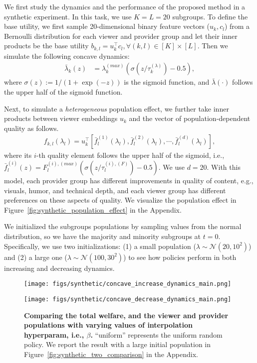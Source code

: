 We first study the dynamics and the performance of the proposed method in a synthetic experiment. In this task, we use $K = L = 20$ subgroups. To define the base utility, we first sample 20-dimensional binary feature vectors ($u_k, c_l$) from a Bernoulli distribution for each viewer and provider group and let their inner products be the base utility $b_{k,l} = u_k^{\top} c_l, \forall (k,l) \in [K] \times [L]$. Then we simulate the following concave dynamics:
\begin{align}
    \bar{\lambda}_k(z) 
        &= \lambda_k^{(max)} (\sigma(z / \tau_k^{(\lambda)}) - 0.5),  \label{eq:experiment_population_dynamics}
\end{align}
where $\sigma(z) := 1 / (1 + \exp(-z))$ is the sigmoid function, and $\bar{\lambda}(\cdot)$ follows the upper half of the sigmoid function.

Next, to simulate a \textit{heterogeneous} population effect, we further take inner products between viewer embeddings $u_k$ and the vector of population-dependent quality as follows. 
\begin{align}
    f_{k,l}(\lambda_l) = u_k^{\top} [\bar{f}_l^{(1)}(\lambda_l), \bar{f}_l^{(2)}(\lambda_l), \cdots, \bar{f}_l^{(d)}(\lambda_l)], \label{eq:synthetic_population_effect}
\end{align} 
where its $i$-th quality element follows the upper half of the sigmoid, i.e., $\bar{f}_{l}^{(i)}(z) = F_{l}^{(i), (max)} (\sigma(z / \tau_{l}^{(i), (F)}) - 0.5)$.
We use $d=20$. With this model, each provider group has different improvements in  quality of content, e.g., visuals, humor, and technical depth, and each viewer group has different preferences on these aspects of quality. We visualize the population effect in Figure~\ref{fig:synthetic_population_effect} in the Appendix.

We initialized the subgroups populations by sampling values from the normal distribution, so we have the majority and minority subgroups at $t=0$. Specifically, we use two initializations: (1) a small population ($\lambda \sim \mathcal{N}(20, 10^2)$) and (2) a large one ($\lambda \sim \mathcal{N}(100, 30^2)$) to see how policies perform in both increasing and decreasing dynamics.

\begin{figure*}
\begin{minipage}{0.99\hsize}
  \centering
  \texttt{[image: figs/synthetic/concave\_increase\_dynamics\_main.png]} 
  \vspace{1mm}
\end{minipage}
\begin{minipage}{0.99\hsize}
  \centering
  \texttt{[image: figs/synthetic/concave\_decrease\_dynamics\_main.png]} 
  \caption{\textbf{Comparing the total welfare, and the viewer and provider populations with varying values of interpolation hyperparam, i.e., $\beta$.} ``uniform'' represents the uniform random policy. We report the result with a large initial population in Figure~\ref{fig:synthetic_two_comparison} in the Appendix.} \label{fig:synthetic_dynamics}
  \vspace{3mm}
\end{minipage}
\end{figure*}

